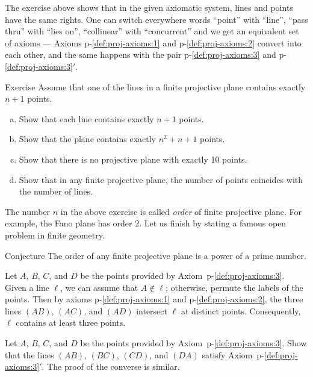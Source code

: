 The exercise above shows that in the given axiomatic system,
lines and points have the same rights.
One can switch everywhere words ``point'' with ``line'', ``pass thru'' with ``lies on'', ``collinear'' with ``concurrent'' and we get an equivalent set of axioms ---  Axioms p-\ref{def:proj-axioms:1} and p-\ref{def:proj-axioms:2} convert into each other,
and the same happens with the pair p-\ref{def:proj-axioms:3} and p-\ref{def:proj-axioms:3}$'$.

\begin{thm}{Exercise}\label{ex:oder}
Assume that one of the lines in a finite projective plane contains exactly $n+1$ points.
\begin{enumerate}[(a)]
\item\label{ex:oder:a} Show that each line contains exactly $n+1$ points.
\item\label{ex:oder:b} Show that the plane contains  exactly $n^2+n+1$ points.
\item\label{ex:oder:c} Show that there is no projective plane with exactly 10 points.
\item\label{ex:oder:d} Show that in any finite projective plane, the number of points coincides with the number of lines.
\end{enumerate}
\end{thm}

The number $n$ in the above exercise is called \emph{order} of finite projective plane.
For example, the Fano plane has order $2$.
Let us finish by stating a famous open problem in finite geometry.

\begin{thm}{Conjecture}
The order of any finite projective plane is a power of a prime number.
\end{thm}


Let $A$, $B$, $C$, and $D$ 
be the points provided by Axiom~p-\ref{def:proj-axioms:3}.
Given a line $\ell$, we can assume that $A\notin \ell$; 
otherwise, permute the labels of the points.
Then by axioms p-\ref{def:proj-axioms:1} and p-\ref{def:proj-axioms:2},
the three lines $(AB)$, $(AC)$, and $(AD)$ intersect $\ell$ at distinct points.
Consequently, $\ell$ contains at least three points. 

Let $A$, $B$, $C$, and $D$ 
be the points provided by Axiom~p-\ref{def:proj-axioms:3}.
Show that the lines $(AB)$, $(BC)$, $(CD)$, and $(DA)$
satisfy Axiom~p-\ref{def:proj-axioms:3}$'$.
The proof of the converse is similar.

